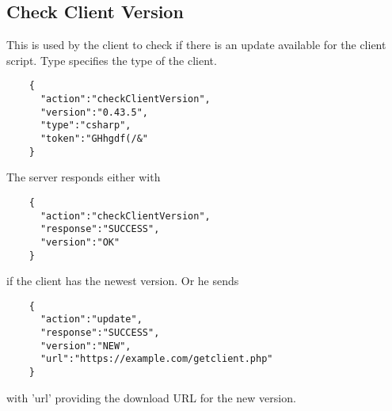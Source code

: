\documentclass{article}
\begin{document}
	\subsection*{Check Client Version}
	This is used by the client to check if there is an update available for the client script. Type specifies the type of the client.
	\begin{verbatim}
	{
	  "action":"checkClientVersion",
	  "version":"0.43.5",
	  "type":"csharp",
	  "token":"GHhgdf(/&"
	}
	\end{verbatim}
	The server responds either with
	\begin{verbatim}
	{
	  "action":"checkClientVersion",
	  "response":"SUCCESS",
	  "version":"OK"
	}
	\end{verbatim}
	if the client has the newest version. Or he sends
	\begin{verbatim}
	{
	  "action":"update",
	  "response":"SUCCESS",
	  "version":"NEW",
	  "url":"https://example.com/getclient.php"
	}
	\end{verbatim}
	with 'url' providing the download URL for the new version.
	
\end{document}
